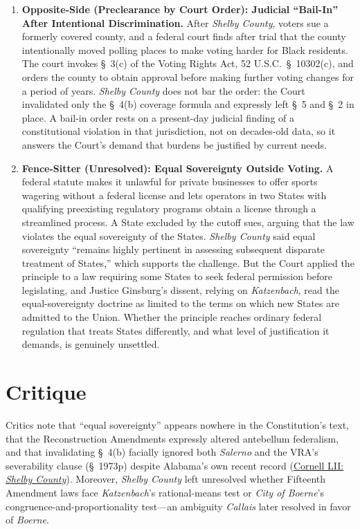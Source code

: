 \documentclass[12pt]{article}
\begin{document}
\begin{enumerate}
\item \textbf{Opposite-Side (Preclearance by Court Order): Judicial ``Bail-In'' After Intentional Discrimination.} After \emph{Shelby County}, voters sue a formerly covered county, and a federal court finds after trial that the county intentionally moved polling places to make voting harder for Black residents. The court invokes \S~3(c) of the Voting Rights Act, 52 U.S.C.\ \S~10302(c), and orders the county to obtain approval before making further voting changes for a period of years. \emph{Shelby County} does not bar the order: the Court invalidated only the \S~4(b) coverage formula and expressly left \S~5 and \S~2 in place. A bail-in order rests on a present-day judicial finding of a constitutional violation in that jurisdiction, not on decades-old data, so it answers the Court's demand that burdens be justified by current needs.

\item \textbf{Fence-Sitter (Unresolved): Equal Sovereignty Outside Voting.} A federal statute makes it unlawful for private businesses to offer sports wagering without a federal license and lets operators in two States with qualifying preexisting regulatory programs obtain a license through a streamlined process. A State excluded by the cutoff sues, arguing that the law violates the equal sovereignty of the States. \emph{Shelby County} said equal sovereignty ``remains highly pertinent in assessing subsequent disparate treatment of States,'' which supports the challenge. But the Court applied the principle to a law requiring some States to seek federal permission before legislating, and Justice Ginsburg's dissent, relying on \emph{Katzenbach}, read the equal-sovereignty doctrine as limited to the terms on which new States are admitted to the Union. Whether the principle reaches ordinary federal regulation that treats States differently, and what level of justification it demands, is genuinely unsettled.

\end{enumerate}

\section{Critique}
Critics note that ``equal sovereignty'' appears nowhere in the Constitution's text, that the Reconstruction Amendments expressly altered antebellum federalism, and that invalidating \S~4(b) facially ignored both \emph{Salerno} and the VRA's severability clause (\S~1973p) despite Alabama's own recent record (\href{https://www.law.cornell.edu/supremecourt/text/12-96}{Cornell LII: \emph{Shelby County}}). Moreover, \emph{Shelby County} left unresolved whether Fifteenth Amendment laws face \emph{Katzenbach}'s rational-means test or \emph{City of Boerne}'s congruence-and-proportionality test---an ambiguity \emph{Callais} later resolved in favor of \emph{Boerne}.
\end{document}
